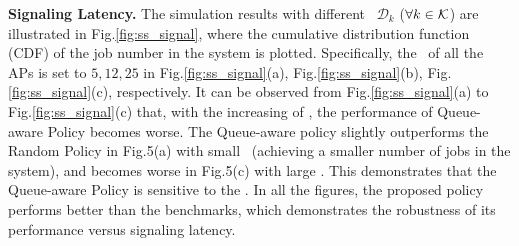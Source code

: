 


\textbf{Signaling Latency.}
The simulation results with different \brlatency~$\mathcal{D}_{k}$ ($\forall k\in\mathcal{K}$) are illustrated in Fig.\ref{fig:ss_signal}, where the cumulative distribution function (CDF) of the job number in the system is plotted.
Specifically, the \brlatency~of all the APs is set to $5, 12, 25$ in Fig.\ref{fig:ss_signal}(a), Fig.\ref{fig:ss_signal}(b), Fig.\ref{fig:ss_signal}(c), respectively.
It can be observed from Fig.\ref{fig:ss_signal}(a) to Fig.\ref{fig:ss_signal}(c) that, with the increasing of \brlatency, the performance of Queue-aware Policy becomes worse.
The Queue-aware policy slightly outperforms the Random Policy in Fig.5(a) with small \brlatency~(achieving a smaller number of jobs in the system), and becomes worse in Fig.5(c) with large \brlatency.
This demonstrates that the Queue-aware Policy is sensitive to the \brlatency.
In all the figures, the proposed policy performs better than the benchmarks, which demonstrates the robustness of its performance versus signaling latency.

